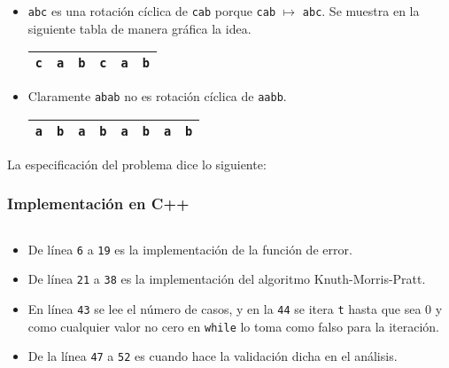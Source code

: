 \begin{itemize}
\item \texttt{abc} es una rotación cíclica de \texttt{cab} porque \texttt{cab} $\mapsto$
\texttt{abc}. Se muestra en la siguiente tabla de manera gráfica la idea.
\begin{table}[h]
\centering
\begin{tabular}{|c|c|c|c|c|c|}
\hline
\texttt{c}                   &  \cellcolor{green}\texttt{a} &  \cellcolor{green}\texttt{b} &
\cellcolor{green} \texttt{c} &  \texttt{a}                  & \texttt{b}                   \\\hline
\end{tabular}
\end{table}

\item Claramente \texttt{abab} no es rotación cíclica de \texttt{aabb}.
\begin{table}[h]
\centering
\begin{tabular}{|c|c|c|c|c|c|c|c|}
\hline
\texttt{a} & \texttt{b} & \texttt{a} &\texttt{b} & \texttt{a} & \texttt{b} & \texttt{a} & \texttt{b} \\\hline
\end{tabular}
\end{table}
\end{itemize}
La especificación del problema dice lo siguiente:


\subsubsection{Implementación en C++}
\inputminted[linenos, frame=lines, fontsize=\footnotesize]{cpp}{problemas/cpp/EC_WORLD.cpp}
\begin{itemize}
\item De línea \texttt{6} a \texttt{19} es la implementación de la función de error.

\item De línea \texttt{21} a \texttt{38} es la implementación del algoritmo Knuth-Morris-Pratt.

\item En línea \texttt{43} se lee el número de casos, y en la \texttt{44} se itera \texttt{t} hasta
que sea 0 y como cualquier valor no cero en \texttt{while} lo toma como falso para la iteración.

\item De la línea \texttt{47} a \texttt{52} es cuando hace la validación dicha en el análisis.

\end{itemize}

